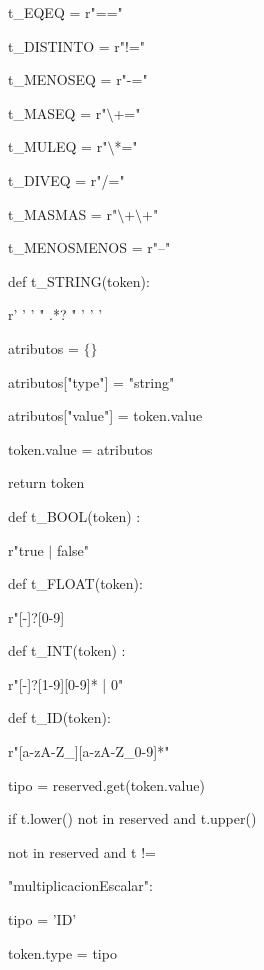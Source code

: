 \begin{multicols}{2}

t\_EQEQ = r"=="

t\_DISTINTO = r"!="

t\_MENOSEQ = r"-="

t\_MASEQ = r"$\setminus$+="

t\_MULEQ = r"$\setminus$*="

t\_DIVEQ = r"/="

t\_MASMAS = r"$\setminus$+$\setminus$+"

t\_MENOSMENOS = r"--"

\columnbreak

def t\_STRING(token):

\hspace{5mm}    r' ' ' " .*? " ' ' '
    
\hspace{5mm}    atributos = $\{ \} $
    
\hspace{5mm}    atributos["type"] = "string"
    
\hspace{5mm}    atributos["value"] = token.value
    
\hspace{5mm}    token.value = atributos
    
\hspace{5mm}    return token
 
\end{multicols} 
    
   
\begin{multicols}{2}   

def t\_BOOL(token) : 

\hspace{5mm}    r"true $|$ false"
    
    
def t\_FLOAT(token):

\hspace{5mm}    r"[-]?[0-9] 
    
def t\_INT(token) : 

\hspace{5mm}    r"[-]?[1-9][0-9]* | 0"
    
\columnbreak

def t\_ID(token):

\hspace{5mm}    r"[a-zA-Z\_][a-zA-Z\_0-9]*"
    
\hspace{5mm}tipo = reserved.get(token.value) 

\hspace{5mm}if t.lower() not in reserved and t.upper() 

\hspace{5mm}not in reserved and t != 

\hspace{5mm}"multiplicacionEscalar":

\hspace{10mm}tipo = 'ID'

\hspace{5mm}token.type = tipo
  
\end{multicols}

